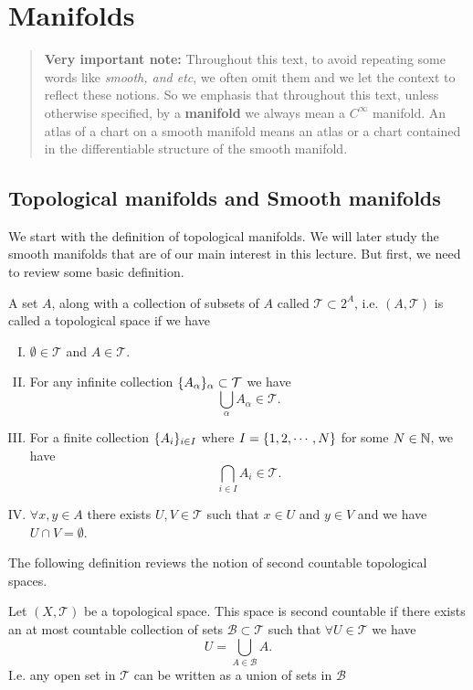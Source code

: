 \chapter{Manifolds}

\begin{quote}
	{\color{orange} \textbf{Very important note:}} Throughout this text, to avoid repeating some words like \emph{smooth,  and etc}, we often omit them and we let the context to reflect these notions. So we emphasis that throughout this text, unless otherwise specified, by a \textbf{manifold} we always mean a $ C^\infty $ manifold. An atlas of a chart on a smooth manifold means an atlas or a chart contained in the differentiable structure of the smooth manifold.
\end{quote} 


\section{Topological manifolds and Smooth manifolds}

We start with the definition of topological manifolds. We will later study the smooth manifolds that are of our main interest in this lecture. But first, we need to review some basic definition.

\begin{definition}
	A set $ A $, along with a collection of subsets of $ A $ called $ \mathcal{T} \subset 2^A $, i.e. $ (A,\mathcal{T}) $ is called a topological space if we have
	\begin{enumerate}[(I)]
		\item $ \emptyset \in \mathcal{T} $ and $ A \in \mathcal{T} $.
		\item For any infinite collection $ \{A_\alpha\}_\alpha \subset \mathcal{T} $ we have
		\[ \bigcup_{\alpha} A_\alpha \in \mathcal{T}. \]
		\item For a finite collection $ \{A_i\}_{i \in I} $ where $ I = \{1,2,\cdots,N\} $ for some $ N \in \mathbb{N} $, we have
		\[ \bigcap_{i \in I} A_i \in \mathcal{T}. \]
		\item $ \forall x,y \in A $ there exists $ U,V \in \mathcal{T} $ such that $ x\in U $ and $ y \in V $ and we have $ U \cap V = \emptyset $.
	\end{enumerate}
\end{definition}


The following definition reviews the notion of second countable topological spaces.

\begin{definition}
	Let $ (X,\mathcal{T}) $ be a topological space. This space is second countable if there exists an at most countable collection of sets $ \mathcal{B} \subset \mathcal{T} $ such that $ \forall U \in \mathcal{T} $ we have
	\[ U = \bigcup_{A \in \mathcal{B}} A. \]
	I.e. any open set in $ \mathcal{T} $ can be written as a union of sets in $ \mathcal{B} $
\end{definition} 

